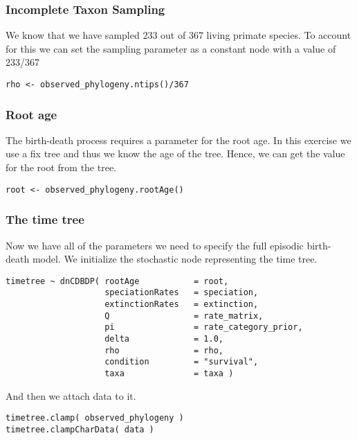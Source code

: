 \subsubsection{Incomplete Taxon Sampling}

We know that we have sampled 233 out of 367 living primate species. 
To account for this we can set the sampling parameter as a constant node with a value of 233/367
{\tt \begin{snugshade*}
\begin{lstlisting}
rho <- observed_phylogeny.ntips()/367
\end{lstlisting}
\end{snugshade*}}


\subsubsection{Root age}

The birth-death process requires a parameter for the root age.
In this exercise we use a fix tree and thus we know the age of the tree.
Hence, we can get the value for the root from the \citet{MagnusonFord2012} tree.
{\tt \begin{snugshade*}
\begin{lstlisting}
root <- observed_phylogeny.rootAge()
\end{lstlisting}
\end{snugshade*}}

\subsubsection{The time tree}

Now we have all of the parameters we need to specify the full episodic birth-death model. 
We initialize the stochastic node representing the time tree.
{\tt \begin{snugshade*}
\begin{lstlisting}
timetree ~ dnCDBDP( rootAge           = root,
                    speciationRates   = speciation,
                    extinctionRates   = extinction, 
                    Q                 = rate_matrix,
                    pi                = rate_category_prior,
                    delta             = 1.0,
                    rho               = rho,
                    condition         = "survival",
                    taxa              = taxa )
\end{lstlisting}
\end{snugshade*}}
And then we attach data to it.
{\tt \begin{snugshade*}
\begin{lstlisting}
timetree.clamp( observed_phylogeny )
timetree.clampCharData( data )
\end{lstlisting}
\end{snugshade*}}

